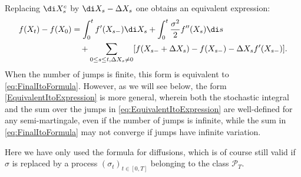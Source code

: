 \begin{xattention}{}
	Replacing $\di X_s^c$ by $\di X_s - \Delta X_s$ one obtains an equivalent expression:
	\begin{equation} \label{eq:EquivalentItoExpression}
		\begin{split}
			f(X_t) - f(X_0) & = \int_0^t f'(X_{s-}) \di X_s + \int_0^t \frac{\sigma^2}{2} f''(X_s) \di s                                    \\
			                & \quad + \sum_{0 \le s \le t, \Delta X_s \neq 0} [f(X_{s-} + \Delta X_s) - f(X_{s-}) - \Delta X_s f'(X_{s-})].
		\end{split}
	\end{equation}
	When the number of jumps is finite, this form is equivalent to \cref{eq:FinalItoFormula}. However, as we will see below, the form \cref{EquivalentItoExpression} is more general, wherein both the stochastic integral and the sum over the jumps in \cref{eq:EquivalentItoExpression} are well-defined for any semi-martingale, even if the number of jumps is infinite, while the sum in \cref{eq:FinalItoFormula} may not converge if jumps have infinite variation.

	Here we have only used the \Ito{} formula for diffusions, which is of course still valid if $\sigma$ is replaced by a process $(\sigma_t)_{t \in [0,T]}$ belonging to the class $\mathcal{P}_T$.
\end{xattention}

